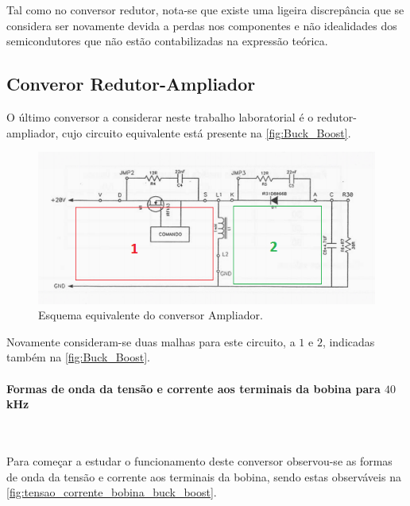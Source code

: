 \documentclass[a4paper,11pt]{article}
\numberwithin{equation}{section}
\begin{document}
Tal como no conversor redutor, nota-se que existe uma ligeira discrepância que se considera ser novamente devida a perdas nos componentes e não idealidades dos semicondutores que não estão contabilizadas na expressão teórica.

\subsection{Converor Redutor-Ampliador}

O último conversor a considerar neste trabalho laboratorial é o redutor-ampliador, cujo circuito equivalente está presente na \autoref{fig:Buck_Boost}.

\begin{figure}[H]
	\centering
	\includegraphics[keepaspectratio=true, scale=1]{teoricas/Buck_Boost}
	\caption{Esquema equivalente do conversor Ampliador.}
	\label{fig:Buck_Boost}
	\vspace{-0.8em}
\end{figure}

Novamente consideram-se duas malhas para este circuito, a $1$ e $2$, indicadas também na \autoref{fig:Buck_Boost}.

\paragraph{Formas de onda da tensão e corrente aos terminais da bobina para $40$ kHz}\mbox{}\

Para começar a estudar o funcionamento deste conversor observou-se as formas de onda da tensão e corrente aos terminais da bobina, sendo estas observáveis na \autoref{fig:tensao_corrente_bobina_buck_boost}.
\end{document}
